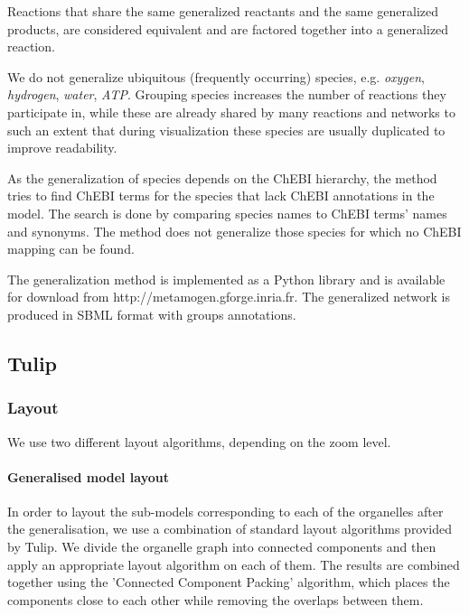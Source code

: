 \documentclass{bioinfo}
\begin{document}
\begin{methods}
Reactions that share the same generalized reactants and the same generalized products, are considered equivalent and are factored together into a generalized reaction. 

We do not generalize ubiquitous (frequently occurring) species, e.g. \textit{oxygen}, \textit{hydrogen}, \textit{water}, \textit{ATP}. Grouping species increases the number of reactions they participate in, while these are already shared by many reactions and networks to such an extent that during visualization these species are usually duplicated\cite{Rohn2012} to improve readability.

As the generalization of species depends on the ChEBI hierarchy, the method tries to find ChEBI terms for the species that lack ChEBI annotations in the model. The search is done by comparing species names to ChEBI terms' names and synonyms. The method does not generalize those species for which no ChEBI mapping can be found. 

The generalization method is implemented as a Python library and is available for download from http://metamogen.gforge.inria.fr. The generalized network is produced in SBML format with groups annotations.

\subsection*{Tulip}
\subsubsection*{Layout}
We use two different layout algorithms, depending on the zoom level.
\paragraph*{Generalised model layout}
In order to layout the sub-models corresponding to each of the organelles after the generalisation, we use a combination of standard layout algorithms provided by Tulip. We divide the organelle graph into connected components and then apply an appropriate layout algorithm on each of them. The results are combined together using the 'Connected Component Packing' algorithm, which places the components close to each other while removing the overlaps between them.


\end{methods}
\end{document}
